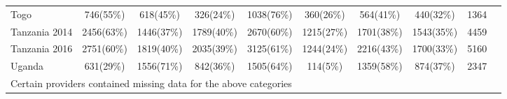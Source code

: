 \begin{tabular}{l*{9}{c}}
Togo&                  {746(55\%)}&  {618(45\%)}&        {326(24\%)}&  {1038(76\%)}&        {360(26\%)}&             {564(41\%)}&             {440(32\%)}&             {1364}\\
Tanzania 2014&     {2456(63\%)}&  {1446(37\%)}&    {1789(40\%)}&  {2670(60\%)}&        {1215(27\%)}&             {1701(38\%)}&             {1543(35\%)}&             {4459}\\
Tanzania 2016&     {2751(60\%)}&  {1819(40\%)}&    {2035(39\%)}&  {3125(61\%)}&        {1244(24\%)}&             {2216(43\%)}&             {1700(33\%)}&             {5160}\\
Uganda&                {631(29\%)}&  {1556(71\%)}&        {842(36\%)}&  {1505(64\%)}&        {114(5\%)}&             {1359(58\%)}&             {874(37\%)}&             {2347}\\
\hline\hline
\multicolumn{9}{l}{\footnotesize Certain providers contained missing data for the above categories}\\
\end{tabular}